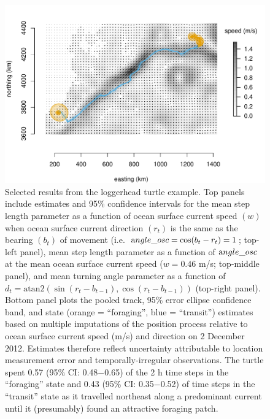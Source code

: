 \documentclass[12pt]{article}\usepackage[]{graphicx}\usepackage[]{color}
\begin{document}
\begin{figure}[htbp]
    \includegraphics[width=\textwidth]{plot_turtleResults2.pdf}
  \caption{Selected results from the loggerhead turtle example. Top panels include estimates and 95\% confidence intervals for the mean step length parameter as a function of ocean surface current speed $(w)$ when ocean surface current direction $(r_t)$ is the same as the bearing $(b_t)$ of movement (i.e.\ ${\text angle\_osc}=\cos(b_t-r_t)=1$; top-left panel), mean step length parameter as a function of ${\text angle\_osc}$ at the mean ocean surface current speed ($w=0.46$ m/s; top-middle panel), and mean turning angle parameter as a function of $d_t=\text{atan2}(\sin(r_t-b_{t-1}),\cos(r_t-b_{t-1}))$ (top-right panel). Bottom panel plots the pooled track, 95\% error ellipse confidence band, and state (orange = ``foraging'', blue = ``transit'') estimates based on multiple imputations of the position process relative to ocean surface current speed (m/s) and direction on 2 December 2012. Estimates therefore reflect uncertainty attributable to location measurement error and temporally-irregular observations. The turtle spent 0.57 (95\% CI: 0.48$-$0.65) of the 2 h time steps in the ``foraging'' state and 0.43 (95\% CI: 0.35$-$0.52) of time steps in the ``transit'' state as it travelled northeast along a predominant current until it (presumably) found an attractive foraging patch.}
  \label{fig:turtleResults}
\end{figure}
\end{document}
